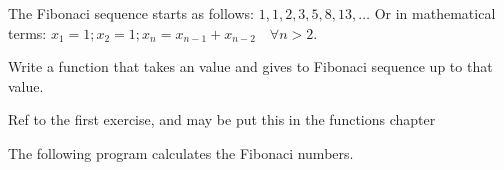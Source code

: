 \begin{Exercise}[title={Fibonaci},difficulty=5]
\label{ex:fibonaci}
\Question\label{ex:fibonaci q1}
The Fibonaci sequence starts as follows: $1, 1, 2, 3, 5, 8, 13, \ldots$
Or in mathematical terms: $ x_1 = 1; x_2 = 1; x_n = x_{n-1} +
x_{n-2}\quad\forall n > 2 $.

Write a function that takes an  value and gives to
Fibonaci sequence up to that value.

Ref to the first exercise, and may be put this in the functions
chapter

\end{Exercise}

\begin{Answer}
\Question
The following program calculates the Fibonaci numbers.

\end{Answer}


